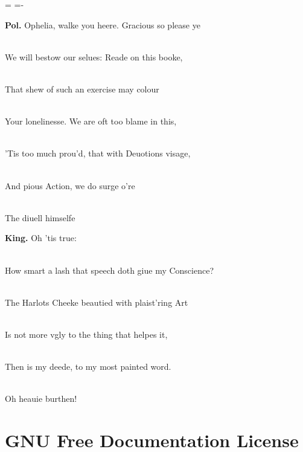 \documentclass[DIV=12,%
               BCOR=0mm,%
               fontsize=10pt,%
               oneside,%
               paper=210mm:11in]{scrbook}
\newcommand*{\forcelinebreak}{\strut\\{}}
\newenvironment*{amuseplay}{
  \leftskip=\parindent
  \parindent=-\parindent
  \smallskip
  \indent
}{\smallskip}
\begin{document}
\begin{amuseplay}


\textbf{Pol.} Ophelia, walke you heere. Gracious so please ye \forcelinebreak 
We will bestow our selues: Reade on this booke, \forcelinebreak 
That shew of such an exercise may colour \forcelinebreak 
Your lonelinesse. We are oft too blame in this, \forcelinebreak 
'Tis too much prou'd, that with Deuotions visage, \forcelinebreak 
And pious Action, we do surge o're \forcelinebreak 
The diuell himselfe


\textbf{King.} Oh 'tis true: \forcelinebreak 
How smart a lash that speech doth giue my Conscience? \forcelinebreak 
The Harlots Cheeke beautied with plaist'ring Art \forcelinebreak 
Is not more vgly to the thing that helpes it, \forcelinebreak 
Then is my deede, to my most painted word. \forcelinebreak 
Oh heauie burthen!



\end{amuseplay}

\part{GNU Free Documentation License}
\end{document}
